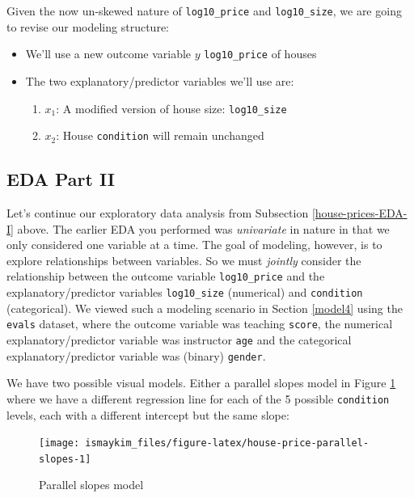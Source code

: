 \documentclass[12pt,]{krantz}
\providecommand{\tightlist}{%
  \setlength{\itemsep}{0pt}\setlength{\parskip}{0pt}}
\begin{document}
Given the now un-skewed nature of \texttt{log10\_price} and
\texttt{log10\_size}, we are going to revise our modeling structure:

\begin{itemize}
\tightlist
\item
  We'll use a new outcome variable \(y\) \texttt{log10\_price} of houses
\item
  The two explanatory/predictor variables we'll use are:

  \begin{enumerate}
  \def\labelenumi{\arabic{enumi}.}
  \tightlist
  \item
    \(x_1\): A modified version of house size: \texttt{log10\_size}
  \item
    \(x_2\): House \texttt{condition} will remain unchanged
  \end{enumerate}
\end{itemize}

\subsection{EDA Part II}\label{eda-part-ii}

Let's continue our exploratory data analysis from Subsection
\ref{house-prices-EDA-I} above. The earlier EDA you performed was
\emph{univariate} in nature in that we only considered one variable at a
time. The goal of modeling, however, is to explore relationships between
variables. So we must \emph{jointly} consider the relationship between
the outcome variable \texttt{log10\_price} and the explanatory/predictor
variables \texttt{log10\_size} (numerical) and \texttt{condition}
(categorical). We viewed such a modeling scenario in Section
\ref{model4} using the \texttt{evals} dataset, where the outcome
variable was teaching \texttt{score}, the numerical
explanatory/predictor variable was instructor \texttt{age} and the
categorical explanatory/predictor variable was (binary) \texttt{gender}.

We have two possible visual models. Either a parallel slopes model in
Figure \ref{fig:house-price-parallel-slopes} where we have a different
regression line for each of the 5 possible \texttt{condition} levels,
each with a different intercept but the same slope:

\begin{figure}

{\centering \texttt{[image: ismaykim\_files/figure-latex/house-price-parallel-slopes-1]} 

}

\caption{Parallel slopes model}\label{fig:house-price-parallel-slopes}
\end{figure}
\end{document}
